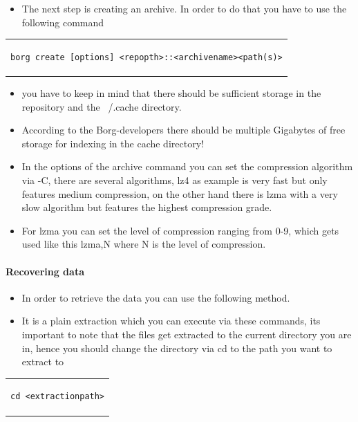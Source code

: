 \documentclass[a4paper,10pt]{article}
\begin{document}
\begin{itemize}[leftmargin=*]
\item The next step is creating an archive. In order to do that you have to use the following command
\end{itemize}

\begin{center}
\begin{tabular}{c}
\begin{lstlisting}
borg create [options] <repopth>::<archivename><path(s)>
\end{lstlisting}
\end{tabular}
\end{center}

\begin{itemize}[leftmargin=*]
\item you have to keep in mind that there should be sufficient storage in the repository and the ~/.cache directory.
\item According to the Borg-developers there should be multiple Gigabytes of free storage for indexing in the cache directory!
\item In the options of the archive command you can set the compression algorithm via -C, there are several algorithms, lz4 as example is very fast but only features medium compression, on the other hand there is lzma with a very slow algorithm but features the highest compression grade.
\item For lzma you can set the level of compression ranging from 0-9, which gets used like this lzma,N where N is the level of compression.
\end{itemize}

\paragraph{Recovering data}

\begin{itemize}[leftmargin=*]
\item In order to retrieve the data you can use the following method.
\item It is a plain extraction which you can execute via these commands, its important to note that the files get extracted to the current directory you are in, hence you should change the directory via cd to the path you want to extract to
\end{itemize}

\begin{center}
\begin{tabular}{c}
\begin{lstlisting}
cd <extractionpath>
\end{lstlisting}
\end{tabular}
\end{center}
\end{document}
